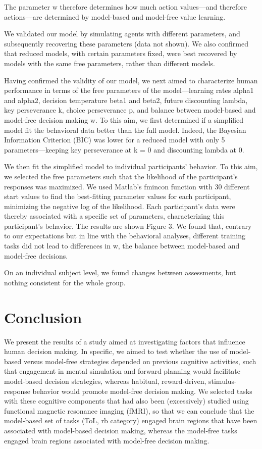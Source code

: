 \documentclass[11pt]{article} %
\begin{document}
The parameter w therefore determines how much action values---and therefore actions---are determined by model-based and model-free value learning.

We validated our model by simulating agents with different parameters, and subsequently recovering these parameters (data not shown). We also confirmed that reduced models, with certain parameters fixed, were best recovered by models with the same free parameters, rather than different models. 

Having confirmed the validity of our model, we next aimed to characterize human performance in terms of the free parameters of the model---learning rates alpha1 and alpha2, decision temperature beta1 and beta2, future discounting lambda, key perseverance k, choice perseverance p, and balance between model-based and model-free decision making w. To this aim, we first determined if a simplified model fit the behavioral data better than the full model. Indeed, the Bayesian Information Criterion (BIC) was lower for a reduced model with only 5 parameters---keeping key perseverance at k = 0 and discounting lambda at 0.

We then fit the simplified model to individual participants' behavior. To this aim, we selected the free parameters such that the likelihood of the participant's responses was maximized. We used Matlab's fmincon function with 30 different start values to find the best-fitting parameter values for each participant, minimizing the negative log of the likelihood. Each participant's data were thereby associated with a specific set of parameters, characterizing this participant's behavior. The results are shown Figure 3. We found that, contrary to our expectations but in line with the behavioral analyses, different training tasks did not lead to differences in w, the balance between model-based and model-free decisions. 

On an individual subject level, we found changes between assessments, but nothing consistent for the whole group.

\section{Conclusion}
We present the results of a study aimed at investigating factors that influence human decision making. In specific, we aimed to test whether the use of model-based versus model-free strategies depended on previous cognitive activities, such that engagement in mental simulation and forward planning would facilitate model-based decision strategies, whereas habitual, reward-driven, stimulus-response behavior would promote model-free decision making. We selected tasks with these cognitive components that had also been (excessively) studied using functional magnetic resonance imaging (fMRI), so that we can conclude that the model-based set of tasks (ToL, rb category) engaged brain regions that have been associated with model-based decision making, whereas the model-free tasks engaged brain regions associated with model-free decision making. 
\end{document}

